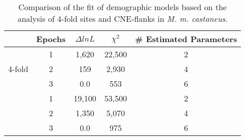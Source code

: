 \begin{table}[h!]
\centering
\caption[Comparison of the fit of demographic models based on the analysis of 4-fold sites and CNE-flanks in \textit{M. m. castaneus}]{Comparison of the fit of demographic models based on the analysis of 4-fold sites and CNE-flanks in \textit{M. m. castaneus}.}
 \begin{tabular}{c c c c c } 

\toprule
       &Epochs&$\Delta lnL$& $\chi^2$& \# Estimated Parameters \\ \hline
\multirow{3}{*}{4-fold} & 	1 &	1,620	 &	22,500 	&	2 \\
		 &	2 &	159		 &	2,930 	&	4 \\
 		&	3 &	0.0		 &	553 		&	6 \\ \hdashline
\multirow{3}{*}{CNE-flank} &	1 &	19,100	 &	53,500 	&	2 \\
		 &	2 &	1,350	 &	5,070	&	4 \\
 		&	3 &	0.0 		 &	975 		&	6 \\
\bottomrule
\end{tabular}
\label{tab:C3S1}
\end{table}
